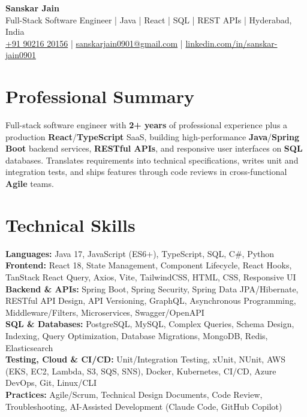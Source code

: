 \documentclass[a4paper,10pt]{article}
\begin{document}
\begin{center}
    {\LARGE \textbf{Sanskar Jain}} \\
    \vspace{2pt}
    Full-Stack Software Engineer \;|\; Java \;|\; React \;|\; SQL \;|\; REST APIs \;|\; Hyderabad, India \\
    \vspace{2pt}
    \href{tel:+919021620156}{+91 90216 20156} \;|\;
    \href{mailto:sanskarjain0901@gmail.com}{sanskarjain0901@gmail.com} \;|\;
    \href{https://www.linkedin.com/in/sanskar-jain0901/}{linkedin.com/in/sanskar-jain0901}
\end{center}

\section*{Professional Summary}
Full-stack software engineer with \textbf{2+ years} of professional experience plus a production \textbf{React}/\textbf{TypeScript} SaaS, building high-performance \textbf{Java}/\textbf{Spring Boot} backend services, \textbf{RESTful APIs}, and responsive user interfaces on \textbf{SQL} databases.
Translates requirements into technical specifications, writes unit and integration tests, and ships features through code reviews in cross-functional \textbf{Agile} teams.

\section*{Technical Skills}
\begin{sloppypar}
\noindent
\textbf{Languages:} Java 17, JavaScript (ES6+), TypeScript, SQL, C\#, Python \\
\textbf{Frontend:} React 18, State Management, Component Lifecycle, React Hooks, TanStack React Query, Axios, Vite, TailwindCSS, HTML, CSS, Responsive UI \\
\textbf{Backend \& APIs:} Spring Boot, Spring Security, Spring Data JPA/Hibernate, RESTful API Design, API Versioning, GraphQL, Asynchronous Programming, Middleware/Filters, Microservices, Swagger/OpenAPI \\
\textbf{SQL \& Databases:} PostgreSQL, MySQL, Complex Queries, Schema Design, Indexing, Query Optimization, Database Migrations, MongoDB, Redis, Elasticsearch \\
\textbf{Testing, Cloud \& CI/CD:} Unit/Integration Testing, xUnit, NUnit, AWS (EKS, EC2, Lambda, S3, SQS, SNS), Docker, Kubernetes, CI/CD, Azure DevOps, Git, Linux/CLI \\
\textbf{Practices:} Agile/Scrum, Technical Design Documents, Code Review, Troubleshooting, AI-Assisted Development (Claude Code, GitHub Copilot)
\end{sloppypar}
\end{document}
